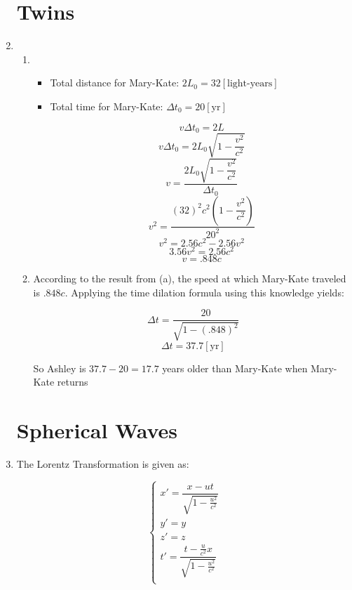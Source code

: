 \begin{enumerate}

    \section{Twins}

  \item

    \begin{enumerate}

      \item 

        \begin{itemize}

          \item Total distance for Mary-Kate: $ 2L_0 = 32[\text{light-years}]$
            
          \item Total time for Mary-Kate: $\Delta t_0 = 20[\text{yr}]$


            $$v\Delta t_0 = 2L$$
            $$v\Delta t_0=2L_0\sqrt{1-\dfrac{v^2}{c^2}}$$
            $$v=\frac{2L_0\sqrt{1-\dfrac{v^2}{c^2}}}{\Delta t_0}$$
            $$v^2=\frac{(32)^2c^2\left(1-\dfrac{v^2}{c^2}\right)}{20^2}$$
            $$v^2=2.56c^2-2.56v^2$$
            $$3.56v^2=2.56c^2$$
            $$\boxed{v=.848c}$$

        \end{itemize}

      \item According to the result from (a), the speed at which Mary-Kate traveled is $.848c$. Applying the time dilation formula using this knowledge yields:

        $$\Delta t = \frac{20}{\sqrt{1-(.848)^2}}$$
        $$\Delta t = 37.7[\text{yr}]$$

        So Ashley is $37.7-20=17.7$ years older than Mary-Kate when Mary-Kate returns

    \end{enumerate}

    \section{Spherical Waves}

  \item The Lorentz Transformation is given as:

      $$\left\{\begin{array}{l}x'=\dfrac{x-ut}{\sqrt{1-\frac{u^2}{c^2}}}\\y'=y\\z'=z\\t'=\dfrac{t-\frac{u}{c^2}x}{\sqrt{1-\frac{u^2}{c^2}}}\\ \end{array}$$


\end{enumerate}
